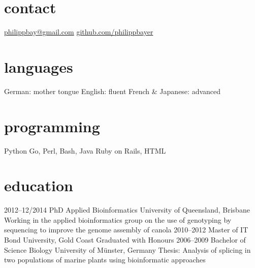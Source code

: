 \documentclass[]{friggeri-cv} %
\begin{document}


\begin{aside} %
\section{contact}
\href{mailto:philippbay@gmail.com}{philippbay@gmail.com}
\href{http://github.com/philippbayer}{github.com/philippbayer}
\section{languages}
German: mother tongue
English: fluent
French \& Japanese: advanced
\section{programming}
Python
Go, Perl, Bash, Java
Ruby on Rails, HTML
\end{aside}


\section{education}

\begin{entrylist}
\entry
{2012--12/2014}
{PhD {\normalfont Applied Bioinformatics}}
{University of Queensland, Brisbane}
{Working in the applied bioinformatics group on the use of genotyping by sequencing to improve the genome assembly of canola}
\entry
{2010--2012}
{Master {\normalfont of IT}}
{Bond University, Gold Coast}
{Graduated with Honours}
\entry
{2006--2009}
{Bachelor of Science {\normalfont Biology}}
{University of Münster, Germany}
{Thesis: Analysis of splicing in two populations of marine plants
using bioinformatic approaches}
\end{entrylist}
\end{document}
